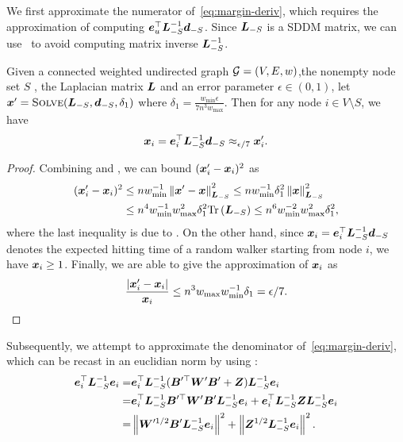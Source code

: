 \documentclass[sigconf]{acmart}
\begin{document}
We first approximate the numerator of~\eqref{eq:margin-deriv}, which requires the approximation of computing \(\boldsymbol{e}_u^\top\boldsymbol{L}_{-S}^{-1}\boldsymbol{d}_{-S}\).
Since \(\boldsymbol{L}_{-S}\) is a SDDM matrix, we can use~ to avoid computing matrix inverse \(\boldsymbol{L}_{-S}^{-1}\).
\begin{lemma}\label{lem:approx-numer}
  Given a connected weighted undirected graph \(\mathcal{G}=(V,E,w)\),the nonempty node set \(S\) , the Laplacian matrix \(\boldsymbol{L}\) and an error parameter \(\epsilon\in(0,1)\), let \(\boldsymbol{x}'=\textsc{Solve}(\boldsymbol{L}_{-S},\boldsymbol{d}_{-S},\delta_1)\) where \(\delta_1=\frac{w_{\min}\epsilon}{7n^3w_{\max}}\). Then for any node \(i\in V\setminus S\), we have
  \begin{equation}\label{eq:approx-numer}
    \boldsymbol{x}_i=\boldsymbol{e}_i^\top\boldsymbol{L}_{-S}^{-1}\boldsymbol{d}_{-S}\approx_{\epsilon/7}\boldsymbol{x}'_i.
  \end{equation}
\end{lemma}
\begin{proof}

  Combining  and , we can bound \((\boldsymbol{x}'_i-\boldsymbol{x}_i)^2\) as
  \begin{align*}
    (\boldsymbol{x}'_i-\boldsymbol{x}_i)^2
     & \le nw_{\min}^{-1}\left\Vert\boldsymbol{x}'-\boldsymbol{x}\right\Vert^2_{\boldsymbol{L}_{-S}}
    \le nw_{\min}^{-1}\delta_1^2\left\Vert\boldsymbol{x}\right\Vert^2_{\boldsymbol{L}_{-S}}        \\
     & \le n^4w_{\min}^{-1}w_{\max}^2\delta_1^2\mathrm{Tr}\left(\boldsymbol{L}_{-S}\right)
    \le n^6w_{\min}^{-2}w_{\max}^2\delta_1^2,
  \end{align*}
  where the last inequality is due to .
  On the other hand, since \(\boldsymbol{x}_i=\boldsymbol{e}_i^\top\boldsymbol{L}_{-S}^{-1}\boldsymbol{d}_{-S}\) denotes the expected hitting time of a random walker starting from node \(i\), we have \(\boldsymbol{x}_i\ge1\).
  Finally, we are able to give the approximation of \(\boldsymbol{x}_i\) as
  \[\frac{\left|\boldsymbol{x}'_i-\boldsymbol{x}_i \right|}{\boldsymbol{x}_i}\le n^3w_{\max}w_{\min}^{-1}\delta_1=\epsilon/7.\]
\end{proof}

Subsequently, we attempt to approximate the denominator of~\eqref{eq:margin-deriv}, which can be recast in an euclidian norm by using :
\begin{equation}\label{eq:denom-solver}
  \begin{split}
    \boldsymbol{e}_i^\top\boldsymbol{L}_{-S}^{-1}\boldsymbol{e}_i
    =&\boldsymbol{e}_i^\top\boldsymbol{L}_{-S}^{-1}(\boldsymbol{B}'^\top\boldsymbol{W}'\boldsymbol{B}'+\boldsymbol{Z})\boldsymbol{L}_{-S}^{-1}\boldsymbol{e}_i\\
    =&\boldsymbol{e}_i^\top\boldsymbol{L}_{-S}^{-1}\boldsymbol{B}'^\top\boldsymbol{W}'\boldsymbol{B}'\boldsymbol{L}_{-S}^{-1}\boldsymbol{e}_i+\boldsymbol{e}_i^\top\boldsymbol{L}_{-S}^{-1}\boldsymbol{Z}\boldsymbol{L}_{-S}^{-1}\boldsymbol{e}_i\\
    =&\left\Vert\boldsymbol{W}'^{1/2}\boldsymbol{B}'\boldsymbol{L}_{-S}^{-1}\boldsymbol{e}_i\right\Vert^2+\left\Vert\boldsymbol{Z}^{1/2}\boldsymbol{L}_{-S}^{-1}\boldsymbol{e}_i\right\Vert^2.
  \end{split}
\end{equation}
\end{document}
